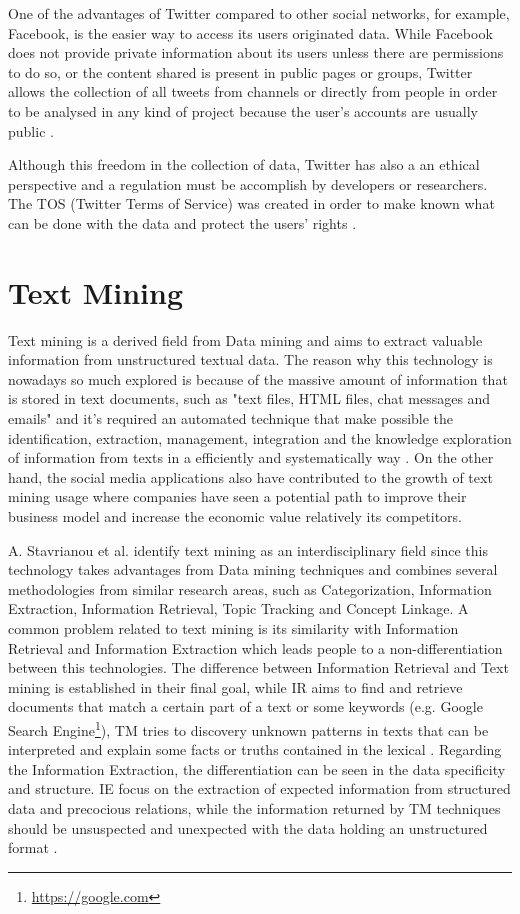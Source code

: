 One of the advantages of Twitter compared to other social networks, for example, Facebook, is the easier way to access its users originated data. While Facebook does not provide private information about its users unless there are permissions to do so, or the content shared is present in public pages or groups, Twitter allows the collection of all tweets from channels or directly from people in order to be analysed in any kind of project because the user's accounts are usually public \cite{kn:Musto2015,kn:Stieglitz2013}.

Although this freedom in the collection of data, Twitter has also a an ethical perspective and a regulation must be accomplish by developers or researchers. The TOS (Twitter Terms of Service) was created in order to make known what can be done with the data and protect the users' rights \cite{kn:kelley2013}.

\section{Text Mining}
Text mining is a derived field from Data mining and aims to extract valuable information from unstructured textual data\cite{kn:He2013}. The reason why this technology is nowadays so much explored is because of the massive amount of information that is stored in text documents, such as "text files, HTML files, chat messages and emails" and it's required an automated technique that make possible the identification, extraction, management, integration and the knowledge exploration of information from texts in a efficiently and systematically way \cite{kn:He2013}. On the other hand, the social media applications also have contributed to the growth of text mining usage where companies have seen a potential path to improve their business model and increase the economic value relatively its competitors.

A. Stavrianou et al. \cite{kn:Stavrianou2007} identify text mining as an interdisciplinary field since this technology takes advantages from Data mining techniques and combines several methodologies from similar research areas, such as Categorization, Information Extraction, Information Retrieval, Topic Tracking and Concept Linkage. A common problem related to text mining is its similarity with Information Retrieval and Information Extraction which leads people to a non-differentiation between this technologies. The difference between Information Retrieval and Text mining is established in their final goal, while IR aims to find and retrieve documents that match a certain part of a text or some keywords (e.g. Google Search Engine\footnote{\url{https://google.com}}), TM tries to discovery unknown patterns in texts that can be interpreted and explain some facts or truths contained in the lexical \cite{kn:Stavrianou2007,kn:He2013,kn:Hotho2005}. Regarding the Information Extraction, the differentiation can be seen in the data specificity and structure. IE focus on the extraction of expected information from structured data and precocious relations, while the information returned by TM techniques should be unsuspected and unexpected with the data holding an unstructured format \cite{kn:Stavrianou2007}.

